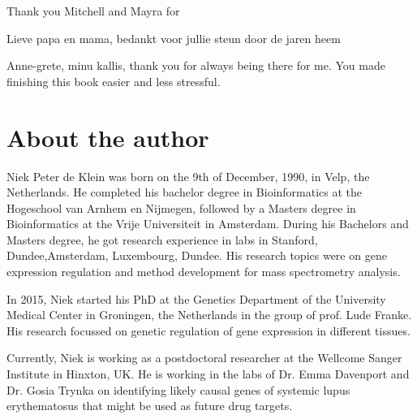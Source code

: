 \begin{appendices}
Thank you Mitchell and Mayra for 

Lieve papa en mama, bedankt voor jullie steun door de jaren heem

Anne-grete, minu kallis, thank you for always being there for me. You made finishing this book easier and less stressful. 

\chapter{About the author}

Niek Peter de Klein was born on the 9th of December, 1990, in Velp, the Netherlands. He completed his bachelor degree in Bioinformatics at the Hogeschool van Arnhem en Nijmegen, followed by a Masters degree in Bioinformatics at the Vrije Universiteit in Amsterdam. During his Bachelors and Masters degree, he got research experience in labs in Stanford, Dundee,Amsterdam, Luxembourg, Dundee. His research topics were on gene expression regulation and method development for mass spectrometry analysis.  

In 2015, Niek started his PhD at the Genetics Department of the University Medical Center in Groningen, the Netherlands in the group of prof. Lude Franke. His research focussed on genetic regulation of gene expression in different tissues. 


Currently, Niek is working as a postdoctoral researcher at the Wellcome Sanger Institute in Hinxton, UK. He is working in the labs of Dr. Emma Davenport and Dr. Gosia Trynka on identifying likely causal genes of systemic lupus erythematosus that might be used as future drug targets.

\cite{magnani2014comprehensive}
\cite{klein2015gene}

\renewcommand{\bibsection}{\section*{List of Publications}}





\end{appendices}
